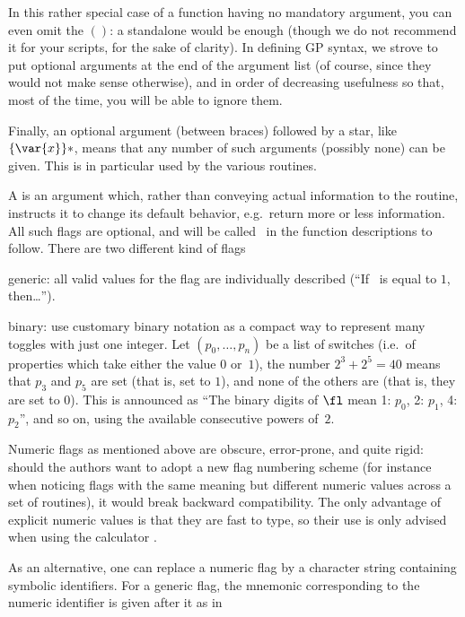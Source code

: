 In this rather special case of a function having no mandatory argument, you
can even omit the $()$: a standalone  would be enough (though we
do not recommend it for your scripts, for the sake of clarity). In defining
GP syntax, we strove to put optional arguments at the end of the argument
list (of course, since they would not make sense otherwise), and in order of
decreasing usefulness so that, most of the time, you will be able to ignore
them.

Finally, an optional argument (between braces) followed by a star, like
$\{\var{x}\}*$, means that any number of such arguments (possibly none) can
be given. This is in particular used by the various  routines.

 A  is an argument which, rather than conveying
actual information to the routine, instructs it to change its default
behavior, e.g.~return more or less information. All such
flags are optional, and will be called \fl\ in the function descriptions to
follow. There are two different kind of flags

\item generic: all valid values for the flag are individually
described (``If \fl\ is equal to $1$, then\dots'').

\item binary: use customary binary notation as a
compact way to represent many toggles with just one integer. Let
$(p_0,\dots,p_n)$ be a list of switches (i.e.~of properties which take either
the value $0$ or~$1$), the number $2^3 + 2^5 = 40$ means that $p_3$ and $p_5$
are set (that is, set to $1$), and none of the others are (that is, they
are set to $0$). This is announced as ``The binary digits of $\fl$ mean 1:
$p_0$, 2: $p_1$, 4: $p_2$'', and so on, using the available consecutive
powers of~$2$.

 Numeric flags as mentioned above are
obscure, error-prone, and quite rigid: should the authors
want to adopt a new flag numbering scheme (for instance when noticing
flags with the same meaning but different numeric values across a set of
routines), it would break backward compatibility. The only advantage of
explicit numeric values is that they are fast to type, so their use is only
advised when using the calculator .

As an alternative, one can replace a numeric flag by a character string
containing symbolic identifiers. For a generic flag, the mnemonic
corresponding to the numeric identifier is given after it as in

